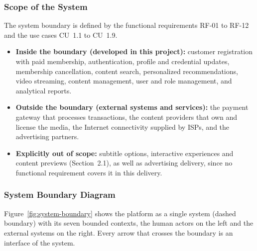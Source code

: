 \documentclass{article}
\begin{document}
\subsubsection{Scope of the System}
 
The system boundary is defined by the functional requirements RF-01 to RF-12 and the use cases CU~1.1 to CU~1.9.
 
\begin{itemize}
    \item \textbf{Inside the boundary (developed in this project):}
    customer registration with paid membership, authentication, profile and credential updates, membership cancellation, content search, personalized recommendations, video streaming, content management, user and role management, and analytical reports.
    \item \textbf{Outside the boundary (external systems and services):}
    the payment gateway that processes transactions, the content providers that own and license the media, the Internet connectivity supplied by ISPs, and the advertising partners.
    \item \textbf{Explicitly out of scope:}
    subtitle options, interactive experiences and content previews (Section~2.1), as well as advertising delivery, since no functional requirement covers it in this delivery.
\end{itemize}
 
\subsubsection{System Boundary Diagram}
 
Figure~\ref{fig:system-boundary} shows the platform as a single system (dashed boundary) with its seven bounded contexts, the human actors on the left and the external systems on the right. Every arrow that crosses the boundary is an interface of the system.
 
\end{document}
